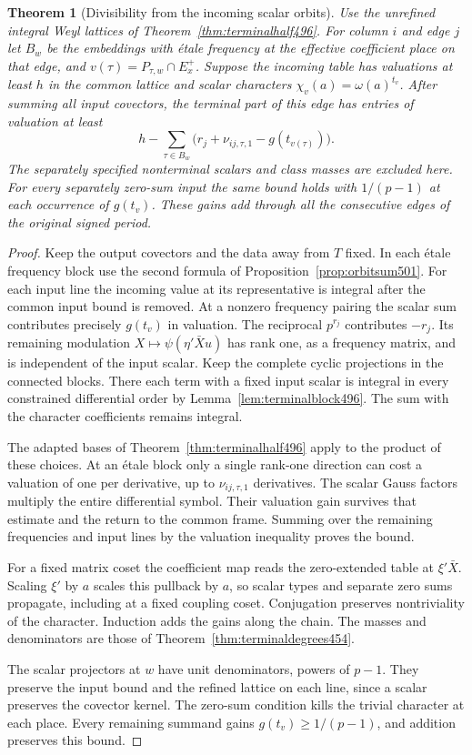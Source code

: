 \documentclass[a4paper,11pt]{article}
\newtheorem{theorem}[proposition]{Theorem}
\theoremstyle{definition}
\theoremstyle{remark}
\numberwithin{equation}{section}
\begin{document}
\begin{theorem}[Divisibility from the incoming scalar orbits]\leavevmode
\label{thm:augterminal501}
Use the unrefined integral Weyl lattices of
Theorem~\ref{thm:terminalhalf496}. For column \(i\) and edge
\(j\) let \(B_w\) be the embeddings with \'etale frequency
at the effective coefficient place on that edge, and
\(v(\tau)=P_{\tau,w}\cap E_x^+\). Suppose the incoming table
has valuations at least \(h\) in the common lattice and scalar
characters \(\chi_v(a)=\omega(a)^{t_v}\). After summing all
input covectors, the terminal part of this edge has entries
of valuation at least
\[
       h-\sum_{\tau\in B_w}
                   \bigl(r_j+\nu_{ij,\tau,1}-g(t_{v(\tau)})\bigr).
\]
The separately specified nonterminal scalars and class masses
are excluded here. For every separately zero-sum input the
same bound holds with \(1/(p-1)\) at each occurrence of
\(g(t_v)\). These gains add through all the consecutive
edges of the original signed period.
\end{theorem}
\begin{proof}
Keep the output covectors and the data away from \(T\) fixed.
In each \'etale frequency block use the second formula of
Proposition~\ref{prop:orbitsum501}. For each input line the
incoming value at its representative is integral after the
common input bound is removed. At a nonzero frequency pairing
the scalar sum contributes precisely \(g(t_v)\) in valuation.
The reciprocal \(p^{r_j}\) contributes \(-r_j\). Its remaining
modulation \(X\mapsto\psi(\eta'\bar X u)\) has rank one,
as a frequency matrix, and is independent of the input scalar.
Keep the complete cyclic projections in the connected blocks.
There each term with a fixed input scalar is integral in every
constrained differential order by Lemma~\ref{lem:terminalblock496}.
The sum with the character coefficients remains integral.

The adapted bases of Theorem~\ref{thm:terminalhalf496}
apply to the product of these choices. At an \'etale block
only a single rank-one direction can cost a valuation of one per
derivative, up to \(\nu_{ij,\tau,1}\) derivatives. The scalar
Gauss factors multiply the entire differential symbol. Their
valuation gain survives that estimate and the return to the
common frame. Summing over the remaining frequencies and
input lines by the valuation inequality proves the bound.

For a fixed matrix coset the coefficient map reads the
zero-extended table at \(\xi'\bar X\). Scaling \(\xi'\) by \(a\)
scales this pullback by \(a\), so scalar types and separate zero
sums propagate, including at a fixed coupling coset. Conjugation
preserves nontriviality of the character. Induction adds the gains
along the chain. The masses and denominators are those of
Theorem~\ref{thm:terminaldegrees454}.

The scalar projectors at \(w\) have unit denominators, powers of
\(p-1\). They preserve the input bound and the refined lattice
on each line, since a scalar preserves the covector kernel. The
zero-sum condition kills the trivial character at each place.
Every remaining summand gains \(g(t_v)\ge1/(p-1)\), and addition
preserves this bound.
\end{proof}
\end{document}
